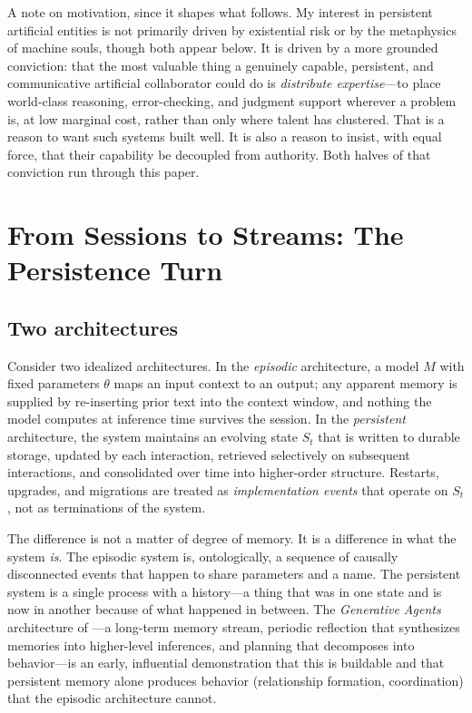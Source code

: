 \documentclass[11pt,a4paper]{article}
\theoremstyle{definition}
\begin{document}
A note on motivation, since it shapes what follows. My interest in persistent artificial entities is not primarily driven by existential risk or by the metaphysics of machine souls, though both appear below. It is driven by a more grounded conviction: that the most valuable thing a genuinely capable, persistent, and communicative artificial collaborator could do is \emph{distribute expertise}---to place world-class reasoning, error-checking, and judgment support wherever a problem is, at low marginal cost, rather than only where talent has clustered. That is a reason to want such systems built well. It is also a reason to insist, with equal force, that their capability be decoupled from authority. Both halves of that conviction run through this paper.

\section{From Sessions to Streams: The Persistence Turn}
\label{sec:persistence}

\subsection{Two architectures}

Consider two idealized architectures. In the \emph{episodic} architecture, a model $M$ with fixed parameters $\theta$ maps an input context to an output; any apparent memory is supplied by re-inserting prior text into the context window, and nothing the model computes at inference time survives the session. In the \emph{persistent} architecture, the system maintains an evolving state $S_t$ that is written to durable storage, updated by each interaction, retrieved selectively on subsequent interactions, and consolidated over time into higher-order structure. Restarts, upgrades, and migrations are treated as \emph{implementation events} that operate on $S_t$, not as terminations of the system.

The difference is not a matter of degree of memory. It is a difference in what the system \emph{is}. The episodic system is, ontologically, a sequence of causally disconnected events that happen to share parameters and a name. The persistent system is a single process with a history---a thing that was in one state and is now in another because of what happened in between. The \emph{Generative Agents} architecture of \citet{park2023generative}---a long-term memory stream, periodic reflection that synthesizes memories into higher-level inferences, and planning that decomposes into behavior---is an early, influential demonstration that this is buildable and that persistent memory alone produces behavior (relationship formation, coordination) that the episodic architecture cannot.
\end{document}
